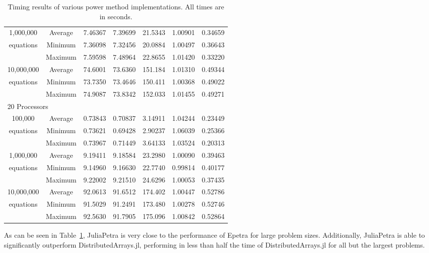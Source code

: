 \documentclass[acmsmall]{acmart}
\begin{document}
\begin{table}
\begin{tabular}{|c c|r|r|r||r|r|}
	\hline
		1,000,000		&Average & 7.46367 & 7.39699 & 21.5343 & 1.00901 & 0.34659 \\
		equations		&Minimum & 7.36098 & 7.32456 & 20.0884 & 1.00497 & 0.36643 \\
						&Maximum & 7.59598 & 7.48964 & 22.8655 & 1.01420 & 0.33220 \\
	\hline
		10,000,000		&Average & 74.6001 & 73.6360 & 151.184 & 1.01310 & 0.49344 \\
		equations		&Minimum & 73.7350 & 73.4646 & 150.411 & 1.00368 & 0.49022 \\
						&Maximum & 74.9087 & 73.8342 & 152.033 & 1.01455 & 0.49271 \\
	\hline
			\multicolumn{7}{|l|}{20 Processors}\\
	\hline
		100,000			&Average & 0.73843 & 0.70837 & 3.14911 & 1.04244 & 0.23449 \\
		equations		&Minimum & 0.73621 & 0.69428 & 2.90237 & 1.06039 & 0.25366 \\
						&Maximum & 0.73967 & 0.71449 & 3.64133 & 1.03524 & 0.20313 \\
	\hline
		1,000,000		&Average & 9.19411 & 9.18584 & 23.2980 & 1.00090 & 0.39463 \\
		equations		&Minimum & 9.14960 & 9.16630 & 22.7740 & 0.99814 & 0.40177 \\
						&Maximum & 9.22002 & 9.21510 & 24.6296 & 1.00053 & 0.37435 \\
	\hline
		10,000,000		&Average & 92.0613 & 91.6512 & 174.402 & 1.00447 & 0.52786 \\
		equations		&Minimum & 91.5029 & 91.2491 & 173.480 & 1.00278 & 0.52746 \\
						&Maximum & 92.5630 & 91.7905 & 175.096 & 1.00842 & 0.52864 \\
	\hline
\end{tabular}

\caption{Timing results of various power method implementations.  All times are in seconds.}
\label{tab:timing-results}
\end{table}

As can be seen in Table~\ref{tab:timing-results}, JuliaPetra is very close to the performance
of Epetra for large problem sizes.
Additionally, JuliaPetra is able to significantly outperform DistributedArrays.jl, performing in less than
half the time of DistributedArrays.jl for all but the largest problems.
\end{document}
